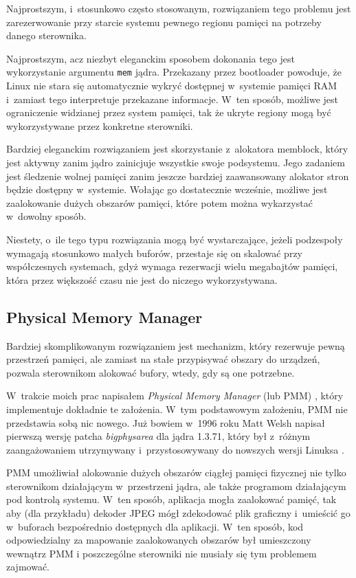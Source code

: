 Najprostszym, i~stosunkowo często stosowanym, rozwiązaniem tego
problemu jest zarezerwowanie przy starcie systemu pewnego regionu
pamięci na potrzeby danego sterownika.

Najprostszym, acz niezbyt eleganckim sposobem dokonania tego jest
wykorzystanie argumentu \lstinline|mem| jądra.  Przekazany przez
bootloader powoduje, że Linux nie stara się automatycznie wykryć
dostępnej w~systemie pamięci RAM i~zamiast tego interpretuje
przekazane informacje.  W~ten sposób, możliwe jest ograniczenie
widzianej przez system pamięci, tak że ukryte regiony mogą być
wykorzystywane przez konkretne sterowniki.

Bardziej eleganckim rozwiązaniem jest skorzystanie z~alokatora
memblock, który jest aktywny zanim jądro zainicjuje wszystkie swoje
podsystemu.  Jego zadaniem jest śledzenie wolnej pamięci zanim jeszcze
bardziej zaawansowany alokator stron będzie dostępny w~systemie.
Wołając go dostatecznie wcześnie, możliwe jest zaalokowanie dużych
obszarów pamięci, które potem można wykarzystać w~dowolny sposób.

Niestety, o~ile tego typu rozwiązania mogą być wystarczające, jeżeli
podzespoły wymagają stosunkowo małych buforów, przestaje się on
skalować przy współczesnych systemach, gdyż wymaga rezerwacji wielu
megabajtów pamięci, która przez większość czasu nie jest do niczego
wykorzystywana.

\subsection{Physical Memory Manager}\label{sec:pmm}

Bardziej skomplikowanym rozwiązaniem jest mechanizm, który rezerwuje
pewną przestrzeń pamięci, ale zamiast na stałe przypisywać obszary do
urządzeń, pozwala sterownikom alokować bufory, wtedy, gdy są one
potrzebne.

W~trakcie moich prac napisałem {\it Physical Memory Manager} (lub PMM)
\cite{patch:pmm}, który implementuje dokładnie te założenia. W~tym
podstawowym założeniu, PMM nie przedstawia sobą nic nowego.  Już
bowiem w~1996 roku Matt Welsh napisał pierwszą wersję patcha
\emph{bigphysarea} dla jądra 1.3.71, który był z~różnym zaangażowaniem
utrzymywany i~przystosowywany do nowszych wersji Linuksa
\cite{patch:bigphys}.

PMM umożliwiał alokowanie dużych obszarów ciągłej pamięci fizycznej
nie tylko sterownikom działającym w~przestrzeni jądra, ale także
programom działającym pod kontrolą systemu.  W~ten sposób, aplikacja
mogła zaalokować pamięć, tak aby (dla przykładu) dekoder JPEG mógł
zdekodować plik graficzny i~umieścić go w~buforach bezpośrednio
dostępnych dla aplikacji.  W~ten sposób, kod odpowiedzialny za
mapowanie zaalokowanych obszarów był umieszczony wewnątrz PMM
i poszczególne sterowniki nie musiały się tym problemem zajmować.

